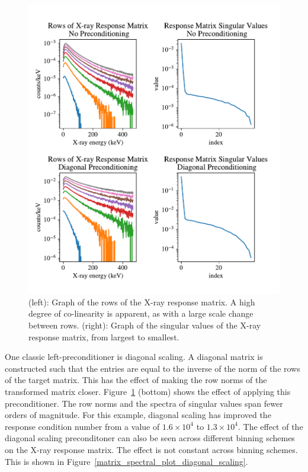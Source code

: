 \begin{figure}[p]
    \centering
    \includegraphics[width=\textwidth]{figures/chapter_4/matrix_spectral_plot/matrix_spectral_plot.pdf}
    \caption{(left): Graph of the rows of the X-ray response matrix. A high degree of co-linearity is apparent, as with a large scale change between rows. (right): Graph of the singular values of the X-ray response matrix, from largest to smallest. }
    \label{matrix_spectral_plot}
\end{figure}

One classic left-preconditioner is diagonal scaling. A diagonal matrix is constructed such that the entries are equal to the inverse of the norm of the rows of the target matrix. This has the effect of making the row norms of the transformed matrix closer. Figure~\ref{matrix_spectral_plot} (bottom) shows the effect of applying this preconditioner. The row norms and the spectra of singular values span fewer orders of magnitude. For this example, diagonal scaling has improved the response condition number from a value of $1.6\times10^4$ to $1.3\times10^4$. The effect of the diagonal scaling preconditoner can also be seen across different binning schemes on the X-ray response matrix. The effect is not constant across binning schemes. This is shown in Figure~\ref{matrix_spectral_plot_diagonal_scaling}.

